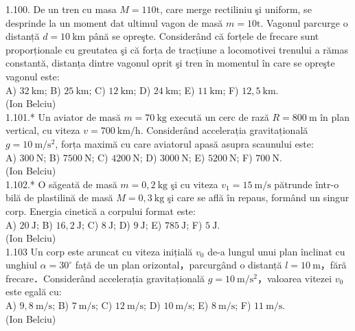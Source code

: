 1.100. De un tren cu masa $M=110 \mathrm{t}$, care merge rectiliniu şi uniform, se desprinde la un moment dat ultimul vagon de masă $m=10 \mathrm{t}$. Vagonul parcurge o distanță $d=10 \mathrm{~km}$ până se opreşte. Considerând că forțele de frecare sunt proporționale cu greutatea şi că forța de tracțiune a locomotivei trenului a rămas constantă, distanța dintre vagonul oprit şi tren în momentul în care se opreşte vagonul este:\\ A) $32 \mathrm{~km}$; B) $25 \mathrm{~km}$; C) $12 \mathrm{~km}$; D) $24 \mathrm{~km}$; E) $11 \mathrm{~km}$; F) $12,5 \mathrm{~km}$.\\ (Ion Belciu)\\

1.101.* Un aviator de masă $m=70 \mathrm{~kg}$ execută un cerc de rază $R=800 \mathrm{~m}$ în plan vertical, cu viteza $v=700 \mathrm{~km} / \mathrm{h}$. Considerând accelerația gravitațională $g=10 \mathrm{~m} / \mathrm{s}^{2}$, forța maximă cu care aviatorul apasă asupra scaunului este:\\ A) $300 \mathrm{~N}$; B) $7500 \mathrm{~N}$; C) $4200 \mathrm{~N}$; D) $3000 \mathrm{~N}$; E) $5200 \mathrm{~N}$; F) $700 \mathrm{~N}$.\\ (Ion Belciu)\\

1.102.* O săgeată de masă $m=0,2 \mathrm{~kg}$ şi cu viteza $v_{1}=15 \mathrm{~m} / \mathrm{s}$ pătrunde într-o bilă de plastilină de masă $M=0,3 \mathrm{~kg}$ şi care se află în repaus, formând un singur corp. Energia cinetică a corpului format este:\\ A) $20 \mathrm{~J}$; B) $16,2 \mathrm{~J}$; C) $8 \mathrm{~J}$; D) $9 \mathrm{~J}$; E) $785 \mathrm{~J}$; F) $5 \mathrm{~J}$.\\ (Ion Belciu)\\

1.103 Un corp este aruncat cu viteza inițială $v_{0}$ de-a lungul unui plan înclinat cu unghiul $\alpha=30^{\circ}$ față de un plan orizontal，parcurgând o distanță $l=10 \mathrm{~m}$，fără frecare．Considerând accelerația gravitațională $g=10 \mathrm{~m} / \mathrm{s}^{2}$，valoarea vitezei $v_{0}$ este egală cu:\\ A) $9,8 \mathrm{~m} / \mathrm{s}$; B) $7 \mathrm{~m} / \mathrm{s}$; C) $12 \mathrm{~m} / \mathrm{s}$; D) $10 \mathrm{~m} / \mathrm{s}$; E) $8 \mathrm{~m} / \mathrm{s}$; F) $11 \mathrm{~m} / \mathrm{s}$.\\ (Ion Belciu)\\

